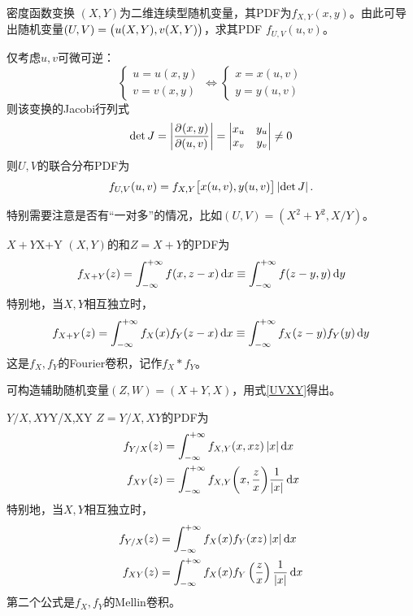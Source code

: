 \begin{theorem}
	{密度函数变换}{}
	$(X,Y)$为二维连续型随机变量，其PDF为$f_{X,Y}(x,y)$。由此可导出随机变量$(U,V)=\bigl(u(X,Y),v(X,Y)\bigr)$，求其PDF $f_{U,V}(u,v)$。
	
	仅考虑$u,v$可微可逆：
	\[
		\begin{cases}
			u=u(x,y)\\
			v=v(x,y)
		\end{cases}\iff
		\begin{cases}
			x=x(u,v)\\
			y=y(u,v)
		\end{cases}
	\]
	则该变换的Jacobi行列式
	\[
		\det J=\left\lvert\frac{\partial^{{}}(x,y)}{\partial{(u,v)}^{{}}}\right\rvert=\begin{vmatrix}
			x_u&y_u\\x_v&y_v
		\end{vmatrix}\neq 0
	\]
	则$U,V$的联合分布PDF为
	\begin{equation}
		\label{UVXY}
		f_{U,V}(u,v)=f_{X,Y}\bigl[x(u,v),y(u,v)\bigr]\left\lvert\det J\right\rvert.
	\end{equation}
\end{theorem}
\begin{remark}
	特别需要注意是否有“一对多”的情况，比如$(U,V)=(X^2+Y^2,X/Y)$。
\end{remark}
\begin{example}{$X+Y$}{X+Y}
	$(X,Y)$的和$Z=X+Y$的PDF为
	\begin{equation}
		f_{X+Y}(z)=\int_{-\infty}^{+\infty} f(x,z-x)\mathop{}\!\mathrm{d} x\equiv\int_{-\infty}^{+\infty} f(z-y,y)\mathop{}\!\mathrm{d} y
	\end{equation}
	特别地，当$X,Y$相互独立时，%
	\[
		f_{X+Y}(z)=\int_{-\infty}^{+\infty} f_X(x)f_Y(z-x)\mathop{}\!\mathrm{d} x\equiv\int_{-\infty}^{+\infty} f_X(z-y)f_Y(y)\mathop{}\!\mathrm{d} y
	\]
	这是$f_X,f_Y$的Fourier卷积，记作$f_X\ast f_Y$。
\end{example}
\begin{remark}
	可构造辅助随机变量$(Z,W)=(X+Y,X)$，用式\eqref{UVXY}得出。
\end{remark}
\begin{example}{$Y/X,XY$}{Y/X,XY}
	$Z=Y/X,XY$的PDF为
	\begin{subequations}
		\begin{align}
			f_{Y/X}(z)&=\int_{-\infty}^{+\infty} f_{X,Y}(x,xz)\left\lvert x\right\rvert\mathop{}\!\mathrm{d} x\\
			f_{XY}(z)&=\int_{-\infty}^{+\infty} f_{X,Y}\biggl(x,\frac zx\biggr)\frac1{\left\lvert x\right\rvert}\mathop{}\!\mathrm{d} x
		\end{align}
	\end{subequations}
	特别地，当$X,Y$相互独立时，
	\begin{subequations}
		\begin{align}
			f_{Y/X}(z)&=\int_{-\infty}^{+\infty} f_X(x)f_Y(xz)\left\lvert x\right\rvert\mathop{}\!\mathrm{d} x\\
			f_{XY}(z)&=\int_{-\infty}^{+\infty} f_X(x)f_Y\left(\frac zx\right)\frac1{\left\lvert x\right\rvert}\mathop{}\!\mathrm{d} x
		\end{align}
	\end{subequations}
	第二个公式是$f_X,f_Y$的Mellin卷积。
\end{example}
